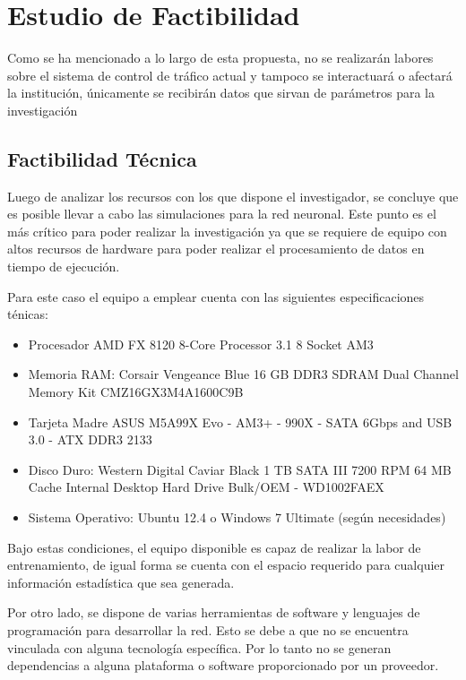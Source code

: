\chapter{Estudio de Factibilidad}
	\label{chap:fact}
	
	Como se ha mencionado a lo largo de esta propuesta, no se realizar\'{a}n
labores sobre el sistema de control de  tr\'{a}fico actual y tampoco se
interactuar\'{a} o afectar\'{a} la instituci\'{o}n, \'{u}nicamente
se recibir\'{a}n datos que sirvan de par\'{a}metros para la investigaci\'{o}n
	
	\section{Factibilidad T\'{e}cnica}
	
	Luego de analizar los recursos con los que dispone el investigador, se concluye
que es posible llevar a cabo las simulaciones para la red neuronal. Este punto
es el m\'{a}s cr\'{i}tico para poder realizar la investigaci\'{o}n ya que se
requiere de equipo con altos recursos de hardware para poder realizar el
procesamiento de datos en tiempo de ejecuci\'{o}n.
	
	Para este caso el equipo a emplear cuenta con las siguientes especificaciones
	t\'{e}nicas:
	\begin{itemize}
	  \item Procesador AMD FX 8120 8-Core Processor 3.1 8 Socket AM3
	  \item Memoria RAM: Corsair Vengeance Blue 16 GB DDR3 SDRAM Dual Channel
	  Memory Kit CMZ16GX3M4A1600C9B
	  \item Tarjeta Madre ASUS M5A99X Evo - AM3+ - 990X - SATA 6Gbps and USB 3.0 -
	  ATX DDR3 2133
	  \item Disco Duro: Western Digital Caviar Black 1 TB SATA III 7200 RPM 64 MB
	  Cache Internal Desktop Hard Drive Bulk/OEM - WD1002FAEX
	  \item Sistema Operativo: Ubuntu 12.4 o Windows 7 Ultimate (seg\'{u}n
	  necesidades)
	  
	\end{itemize}
	
	Bajo estas condiciones, el equipo disponible es capaz de realizar la labor de
entrenamiento, de igual forma se cuenta con el espacio requerido para cualquier
informaci\'{o}n estad\'{i}stica que sea generada. 

	Por otro lado, se dispone de varias herramientas de software y lenguajes de
programaci\'{o}n para desarrollar la red. Esto se debe a que no se
encuentra vinculada con alguna tecnolog\'{i}a espec\'{i}fica. Por lo tanto no
se generan dependencias a alguna plataforma o software proporcionado por un
proveedor.
	
